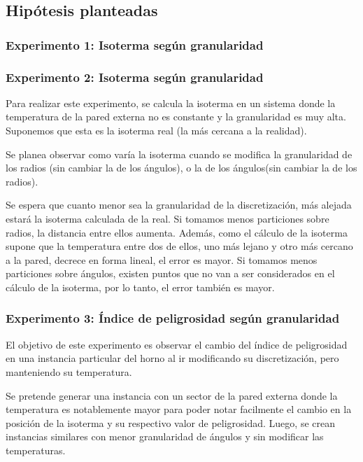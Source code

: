   \subsection{Hipótesis planteadas}

    \subsubsection*{Experimento 1: Isoterma según granularidad}

  	\subsubsection*{Experimento 2: Isoterma según granularidad}
  	Para realizar este experimento, se calcula la isoterma en un sistema donde la temperatura de la pared externa no es constante y la granularidad es muy alta. Suponemos que esta es la isoterma real (la más cercana a la realidad). 

  	Se planea observar como varía la isoterma cuando se modifica la granularidad de los radios (sin cambiar la de los ángulos), o la de los ángulos(sin cambiar la de los radios).

    Se espera que cuanto menor sea la granularidad de la discretización, más alejada estará la isoterma calculada de la real. Si tomamos menos particiones sobre radios, la distancia entre ellos aumenta. Además, como el cálculo de la isoterma supone que la temperatura entre dos de ellos, uno más lejano y otro más cercano a la pared, decrece en forma lineal, el error es mayor. Si tomamos menos particiones sobre ángulos, existen puntos que no van a ser considerados en el cálculo de la isoterma, por lo tanto, el error también es mayor.

  	\subsubsection*{Experimento 3: Índice de peligrosidad según granularidad}
  	El objetivo de este experimento es observar el cambio del índice de peligrosidad en una instancia particular del horno al ir modificando su discretización, pero manteniendo su temperatura. 

  	Se pretende generar una instancia con un sector de la pared externa donde la temperatura es notablemente mayor para poder notar facilmente el cambio en la posición de la isoterma y su respectivo valor de peligrosidad. Luego, se crean instancias similares con menor granularidad de ángulos y sin modificar las temperaturas. 

